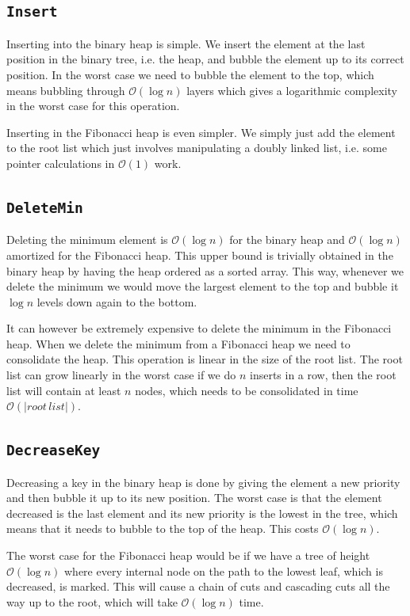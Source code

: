 \documentclass[a4paper,oneside,article,11pt]{memoir}
\begin{document}
\subsection{\texttt{Insert}}
Inserting into the binary heap is simple. We insert the element at the last position in the binary tree, i.e. the heap, and bubble the element up to its correct position. In the worst case we need to bubble the element to the top, which means bubbling through $\mathcal{O}(\log n)$ layers which gives a logarithmic complexity in the worst case for this operation.

Inserting in the Fibonacci heap is even simpler. We simply just add the element to the root list which just involves manipulating a doubly linked list, i.e. some pointer calculations in $\mathcal{O}(1)$ work.

\subsection{\texttt{DeleteMin}}
Deleting the minimum element is $\mathcal{O}(\log{n})$ for the binary heap and $\mathcal{O}(\log{n})$ amortized for the Fibonacci heap. This upper bound is trivially obtained in the binary heap by having the heap ordered as a sorted array. This way, whenever we delete the minimum we would move the largest element to the top and bubble it $\log n$ levels down again to the bottom.

It can however be extremely expensive to delete the minimum in the Fibonacci heap. When we delete the minimum from a Fibonacci heap we need to consolidate the heap. This operation is linear in the size of the root list. The root list can grow linearly in the worst case if we do $n$ inserts in a row, then the root list will contain at least $n$ nodes, which needs to be consolidated in time $\mathcal{O}(\vert root\,list \vert)$.

\subsection{\texttt{DecreaseKey}}
Decreasing a key in the binary heap is done by giving the element a new priority and then bubble it up to its new position. The worst case is that the element decreased is the last element and its new priority is the lowest in the tree, which means that it needs to bubble to the top of the heap. This costs $\mathcal{O}(\log n)$.

The worst case for the Fibonacci heap would be if we have a tree of height $\mathcal{O}(\log n)$ where every internal node on the path to the lowest leaf, which is decreased, is marked. This will cause a chain of cuts and cascading cuts all the way up to the root, which will take $\mathcal{O}(\log n)$ time.
\end{document}
